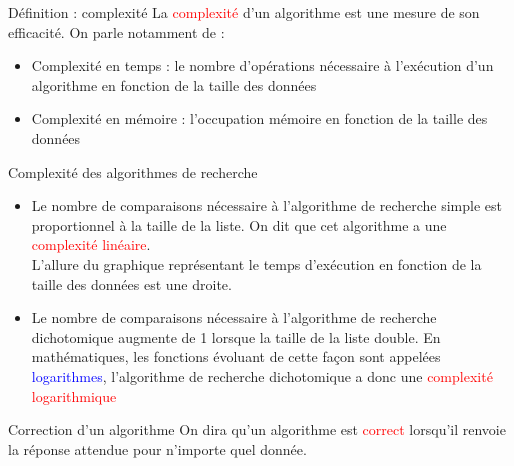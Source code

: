 \documentclass[10pt]{beamer}
\begin{document}
\begin{frame}
	\mframe{\NA}
	\begin{alertblock}{Définition : complexité}
		La \textcolor{red}{complexité} d'un algorithme est une mesure de son efficacité.
		\onslide<2-> On parle notamment de :
		\begin{itemize}
			\item<3-> Complexité en temps : le nombre d'opérations nécessaire à l'exécution d'un algorithme en fonction de la taille des données
			\item<4-> Complexité en mémoire : l'occupation mémoire en fonction de la taille des données
		\end{itemize}
	\end{alertblock}
\end{frame}

\begin{frame}
	\mframe{\NA}
	\begin{block}{Complexité des algorithmes de recherche}
		\begin{itemize}
			\item<2-> Le nombre de comparaisons nécessaire à l'algorithme de recherche simple est proportionnel à la taille de la liste. 
			\onslide<3->On dit que cet algorithme a une \textcolor{red}{complexité linéaire}.\\
			\onslide<4->L'allure du graphique représentant le temps d'exécution en fonction de la taille des données est une droite.
			\item<5-> Le nombre de comparaisons nécessaire à l'algorithme de recherche dichotomique augmente de 1 lorsque la taille de la liste double.
			\onslide<6-> En mathématiques, les fonctions évoluant de cette façon sont appelées \textcolor{blue}{logarithmes}, l'algorithme de recherche dichotomique a donc une \textcolor{red}{complexité logarithmique}
		\end{itemize}
	\end{block}	
\end{frame}

\begin{frame}
	\mframe{\NA}
	\begin{alertblock}{Correction d'un algorithme}
		On dira qu'un algorithme est \textcolor{red}{correct}
		\onslide<2-> lorsqu'il renvoie la réponse attendue pour n'importe quel donnée.
	\end{alertblock}
\end{frame}
\end{document}
